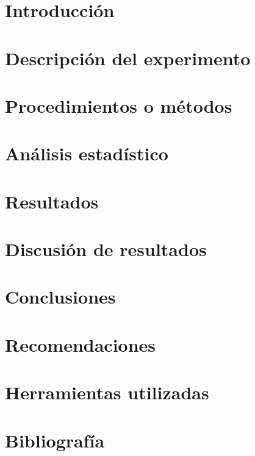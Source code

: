 \documentclass[a4paper]{report}
\begin{document}
\sloppy



\section{Introducción}


\section{Descripción del experimento}


\section{Procedimientos o métodos}


\section{Análisis estadístico}


\section{Resultados}


\section{Discusión de resultados}


\section{Conclusiones}


\section{Recomendaciones}


\section*{Herramientas utilizadas}


\section*{Bibliografía}

\end{document}
